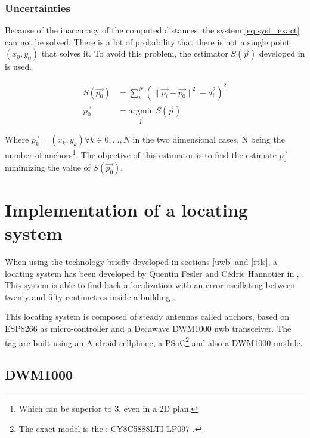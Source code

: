\subsubsection{Uncertainties}

Because of the inaccuracy of the computed distances, the system \ref{eq:syst_exact} can not be solved. There is a lot of probability that there is not a single point $(x_0, y_0)$ that solves it. To avoid this problem, the estimator $S(\vec{p})$ developed in \cite{zhou2009efficient} is used.

\begin{equation}
\label{eq:syst_approx}
\begin{aligned}
S(\vec{p_0}) &= \sum_i^N (\|\vec{p_i} - \vec{p_0}\| ^2 - d_i^2 )^2 \\
\vec{p_0} &= \underset{\vec{p}}{\text{argmin}}~ S(\vec{p})
\end{aligned}
\end{equation}

Where $\vec{p_k} = (x_k, y_k) \forall k\in {0, ... , N}$ in the two dimensional cases, N being the number of anchors\footnote{Which can be superior to 3, even in a 2D plan.}. The objective of this estimator is to find the estimate $\vec{p_0}$ minimizing the value of $S(\vec{p_0})$.

\section{Implementation of a locating system}
\label{loc_syst}

When using the technology briefly developed in sections \ref{uwb} and \ref{rtls}, a locating system has been developed by Quentin Fesler and Cédric Hannotier in  \cite{fesler2018high}, \cite{hannotier2019indoor}. This system is able to find back a localization with an error oscillating between twenty and fifty centimetres inside a building \cite{guyard2019navigation}.
\vspace{2mm}

This locating system is composed of steady antennas called anchors, based on ESP8266 as micro-controller and a Decawave DWM1000 \gls{uwb} transceiver\cite{decawave}. The tag are built using an Android cellphone, a PSoC\footnote{The exact model is the : CY8C5888LTI-LP097 \cite{guyard2019navigation}.} and also a DWM1000 module.

\subsection{DWM1000}
\label{dwm1000}

